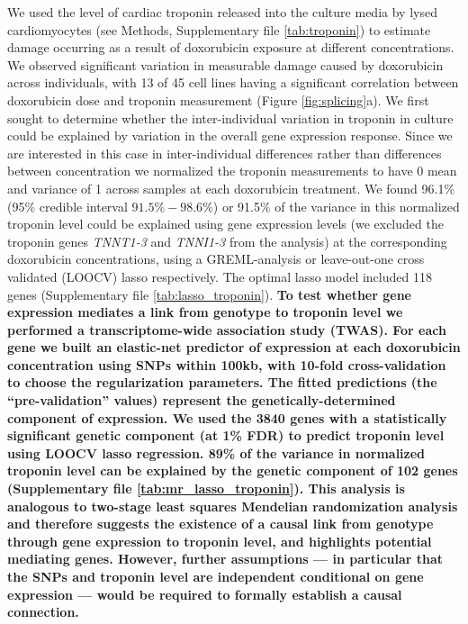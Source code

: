 \documentclass[9pt,lineno]{elife}
\newcommand{\tempbold}[1]{\textbf{#1}}
\begin{document}
We used the level of cardiac troponin released into the culture media by lysed cardiomyocytes (see Methods, Supplementary file \ref{tab:troponin}) to estimate damage occurring as a result of doxorubicin exposure at different concentrations. We observed significant variation in measurable damage caused by doxorubicin across individuals, with 13 of 45 cell lines having a significant correlation between doxorubicin dose and troponin measurement (Figure \ref{fig:splicing}a). We first sought to determine whether the inter-individual variation in troponin in culture could be explained by variation in the overall gene expression response. Since we are interested in this case in inter-individual differences rather than differences between concentration we normalized the troponin measurements to have 0 mean and variance of 1 across samples at each doxorubicin treatment. We found 96.1\% (95\% credible interval $91.5\%  - 98.6\%$) or 91.5\% of the variance in this normalized troponin level could be explained using gene expression levels (we excluded the troponin genes \emph{TNNT1-3} and \emph{TNNI1-3} from the analysis) at the corresponding doxorubicin concentrations, using a GREML-analysis \citep{Yang2010-cx} or leave-out-one cross validated (LOOCV) lasso \citep{tibshirani1996regression} respectively. The optimal lasso model included 118 genes (Supplementary file \ref{tab:lasso_troponin}). \tempbold{To test whether gene expression mediates a link from genotype to troponin level we performed a transcriptome-wide association study \citep{Gamazon2015-ij} (TWAS). For each gene we built an elastic-net predictor of expression at each doxorubicin concentration using SNPs within 100kb, with 10-fold cross-validation to choose the regularization parameters. The fitted predictions (the ``pre-validation'' values) represent the genetically-determined component of expression. We used the 3840 genes with a statistically significant genetic component (at 1\% FDR) to predict troponin level using LOOCV lasso regression. 89\% of the variance in normalized troponin level can be explained by the genetic component of 102 genes (Supplementary file \ref{tab:mr_lasso_troponin}). This analysis is analogous to two-stage least squares Mendelian randomization \citep{Angrist1995-kp} analysis and therefore suggests the existence of a causal link from genotype through gene expression to troponin level, and highlights potential mediating genes. However, further assumptions --- in particular that the SNPs and troponin level are independent conditional on gene expression --- would be required to formally establish a causal connection.}
\end{document}
